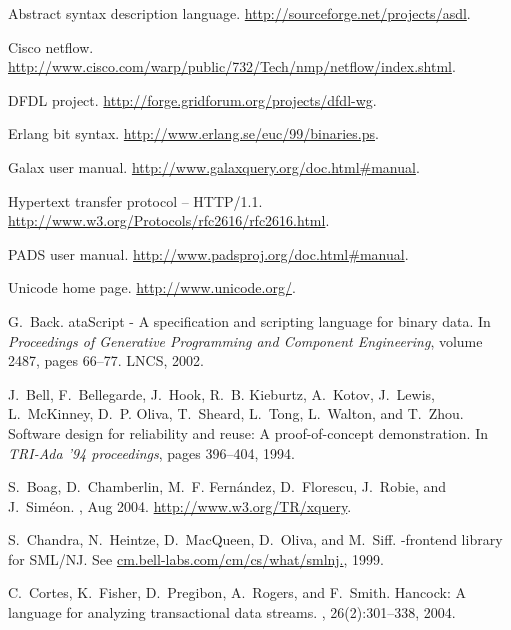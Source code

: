 \documentclass{sigplanconf}
\begin{document}

\small
\begin{thebibliography}{10}

Abstract syntax description language.
\newblock \url{http://sourceforge.net/projects/asdl}.

Cisco netflow.
\newblock
  \url{http://www.cisco.com/warp/public/732/Tech/nmp/netflow/index.shtml}.

{DFDL} project.
\newblock \url{http://forge.gridforum.org/projects/dfdl-wg}.

Erlang bit syntax.
\newblock \url{http://www.erlang.se/euc/99/binaries.ps}.

{G}alax user manual.
\newblock \url{http://www.galaxquery.org/doc.html#manual}.

Hypertext transfer protocol -- {HTTP}/1.1.
\newblock \url{http://www.w3.org/Protocols/rfc2616/rfc2616.html}.

{PADS} user manual.
\newblock \url{http://www.padsproj.org/doc.html#manual}.

Unicode home page.
\newblock \url{http://www.unicode.org/}.

G.~Back.
ata{S}cript - {A} specification and scripting language for binary
  data.
\newblock In {\em Proceedings of Generative Programming and Component
  Engineering}, volume 2487, pages 66--77. LNCS, 2002.

J.~Bell, F.~Bellegarde, J.~Hook, R.~B. Kieburtz, A.~Kotov, J.~Lewis,
  L.~McKinney, D.~P. Oliva, T.~Sheard, L.~Tong, L.~Walton, and T.~Zhou.
\newblock Software design for reliability and reuse: A proof-of-concept
  demonstration.
\newblock In {\em TRI-Ada '94 proceedings}, pages 396--404, 1994.

S.~Boag, D.~Chamberlin, M.~F. Fern\'andez, D.~Florescu, J.~Robie, and
  J.~Sim\'eon.
, Aug 2004.
\newblock \url{http://www.w3.org/TR/xquery}.

S.~Chandra, N.~Heintze, D.~Mac{Q}ueen, D.~Oliva, and M.~Siff.
-frontend library for {SML/NJ}.
\newblock See \url{cm.bell-labs.com/cm/cs/what/smlnj.}, 1999.

C.~Cortes, K.~Fisher, D.~Pregibon, A.~Rogers, and F.~Smith.
\newblock Hancock: A language for analyzing transactional data streams.
, 26(2):301--338, 2004.


\end{thebibliography}
\end{document}
